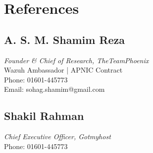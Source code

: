 \documentclass[11pt,a4paper]{article}
\begin{document}
\section{References}
\begin{multicols}{2}
\subsection{A. S. M. Shamim Reza}
\textit{Founder \& Chief of Research, TheTeamPhoenix}\\
Wazuh Ambassador | APNIC Contract\\
Phone: 01601-445773\\
Email: sohag.shamim@gmail.com

\subsection{Shakil Rahman}
\textit{Chief Executive Officer, Gotmyhost}\\
Phone: 01601-445773\\
\end{multicols}
\end{document}
